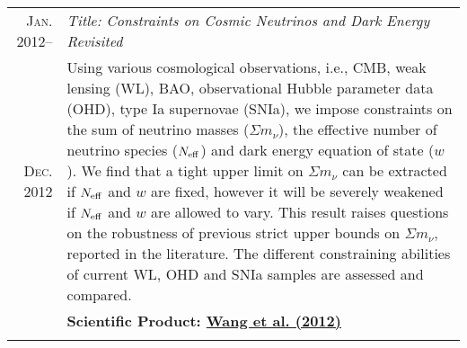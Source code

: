 \documentclass[letterpaper,10pt]{article}
\begin{document}
\begin{longtable}{r|p{5.5in}}
  \textsc{Jan. 2012}--   &   \emph{Title: Constraints on Cosmic Neutrinos and Dark Energy Revisited}  \\
  \textsc{Dec. 2012}     &   \small{Using various cosmological observations, i.e., CMB, weak lensing (WL), BAO, observational Hubble
  parameter data (OHD), type Ia supernovae (SNIa), we impose constraints on the sum of neutrino masses ($\Sigma m_{\nu}$), the
  effective number of neutrino species ($N_{\rm eff}$) and dark energy equation of state ($w$). We find that a tight upper limit
  on $\Sigma m_{\nu}$ can be extracted if $N_{\rm eff}$ and $w$ are fixed, however it will be severely weakened if $N_{\rm eff}$ and
  $w$ are allowed to vary. This result raises questions on the robustness of previous strict upper bounds on $\Sigma m_{\nu}$,
  reported in the literature.
  The different constraining abilities of current WL, OHD and SNIa samples are assessed and compared.}\\
  &   \textbf{Scientific Product: \hyperlink{12.wang.jcap}{Wang et al. (2012)}}  \\
  \multicolumn{2}{c}{} \\

\end{longtable}
\end{document}
